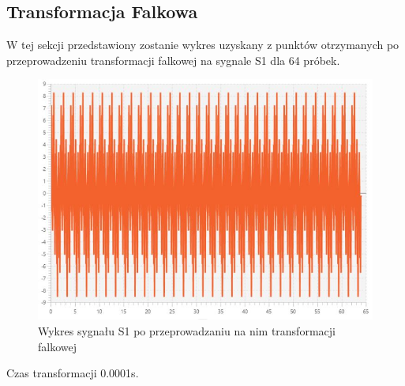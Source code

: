 \documentclass[12pt]{article}
\begin{document}
\subsection{Transformacja Falkowa}
W tej sekcji przedstawiony zostanie wykres uzyskany z punktów otrzymanych po przeprowadzeniu transformacji falkowej na sygnale S1 dla 64 próbek.
\begin{figure}[H]
	\centering
	\includegraphics[width=\linewidth]{falkowa-s1}
	\caption{Wykres sygnału S1 po przeprowadzaniu na nim transformacji falkowej}
	\label{s1-falkowa}
\end{figure}
Czas transformacji 0.0001s.


\end{document}
